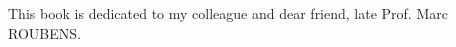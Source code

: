 
%
%
%

\begin{dedication}
This book is dedicated to my colleague and dear friend, late Prof. Marc ROUBENS.
\end{dedication}




